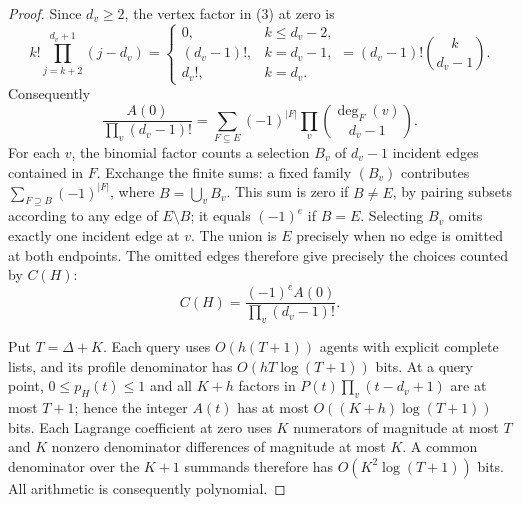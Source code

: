 \documentclass[11pt]{article}
\begin{document}
\begin{proof}
Since $d_v\geq2$, the vertex factor in (3) at zero is
\[
 k!\prod_{j=k+2}^{d_v+1}(j-d_v)
   =
   \begin{cases}
   0,&k\leq d_v-2,\\
   (d_v-1)!,&k=d_v-1,\\
   d_v!,&k=d_v.
   \end{cases}
   =(d_v-1)!\binom{k}{d_v-1}.
\]
Consequently
\[
 \frac{A(0)}{\prod_v(d_v-1)!}
      =\sum_{F\subseteq E}(-1)^{|F|}
          \prod_v\binom{\deg_F(v)}{d_v-1}.          \tag{4}
\]
For each $v$, the binomial factor counts a selection $B_v$ of $d_v-1$
incident edges contained in $F$. Exchange the finite sums: a fixed
family $(B_v)$ contributes
$\sum_{F\supseteq B}(-1)^{|F|}$, where $B=\bigcup_v B_v$.
This sum is zero if $B\ne E$, by pairing subsets according to any edge
of $E\setminus B$; it equals $(-1)^e$ if $B=E$.
Selecting $B_v$ omits exactly one incident edge at $v$.
The union is $E$ precisely when no edge is omitted at both endpoints.
The omitted edges therefore give precisely the choices counted by $C(H)$:
\[
 C(H)=\frac{(-1)^e A(0)}{\prod_v(d_v-1)!}.          \tag{5}
\]

Put $T=\Delta+K$. Each query uses $O(h(T+1))$ agents with explicit
complete lists, and its profile denominator has $O(hT\log(T+1))$ bits.
At a query point, $0\leq p_H(t)\leq1$ and all $K+h$ factors in
$P(t)\prod_v(t-d_v+1)$ are at most $T+1$; hence the integer $A(t)$
has at most $O((K+h)\log(T+1))$ bits.
Each Lagrange coefficient at zero uses $K$ numerators of magnitude at
most $T$ and $K$ nonzero denominator differences of magnitude at most
$K$. A common denominator over the $K+1$ summands therefore has
$O(K^2\log(T+1))$ bits. All arithmetic is consequently polynomial.
\end{proof}
\end{document}
